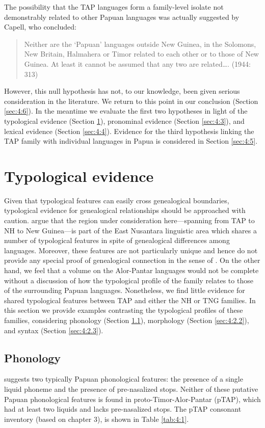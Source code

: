 The possibility that the TAP languages form a family-level isolate not demonstrably related to other Papuan languages was actually suggested by Capell, who concluded:

\begin{quote}
Neither are the `Papuan' languages outside New Guinea, in the Solomons, New Britain, Halmahera or Timor related to each other or to those of New Guinea. At least it cannot be assumed that any two are related{\dots}. (1944: 313)
\end{quote}

However, this null hypothesis has not, to our knowledge, been given serious consideration in the literature. We return to this point in our conclusion (Section \ref{sec:4:6}). In the meantime we evaluate the first two hypotheses in light of the typological evidence (Section \ref{sec:4:2}), pronominal evidence (Section \ref{sec:4:3}), and lexical evidence (Section \ref{sec:4:4}). Evidence for the third hypothesis linking the TAP family with individual languages in Papua is considered in Section \ref{sec:4:5}.

\section{Typological evidence}\label{sec:4:2}
Given that typological features can easily cross genealogical boundaries, typological evidence for genealogical relationships should be approached with caution. \citet{KlamerEtAl2008} argue that the region under consideration here---spanning from TAP to NH to New Guinea---is part of the East Nusantara linguistic area which shares a number of typological features in spite of genealogical differences among languages. Moreover, these features are not particularly unique and hence do not provide any special proof of genealogical connection in the sense of \citet{Meillet1967}. On the other hand, we feel that a volume on the Alor-Pantar languages would not be complete without a discussion of how the typological profile of the family relates to those of the surrounding Papuan languages. Nonetheless, we find little evidence for shared typological features between TAP and either the NH or TNG families. In this section we provide examples contrasting the typological profiles of these families, considering phonology (Section \ref{sec:4:2.1}), morphology (Section \ref{sec:4:2.2}), and syntax (Section \ref{sec:4:2.3}).

\subsection{Phonology}\label{sec:4:2.1}
\citet{Foley1998} suggests two typically Papuan phonological features: the presence of a single liquid phoneme and the presence of pre-nasalized stops. Neither of these putative Papuan phonological features is found in proto-Timor-Alor-Pantar (pTAP), which had at least two liquids and lacks pre-nasalized stops. The pTAP consonant inventory (based on chapter 3), is shown in Table \ref{tab:4:1}.


